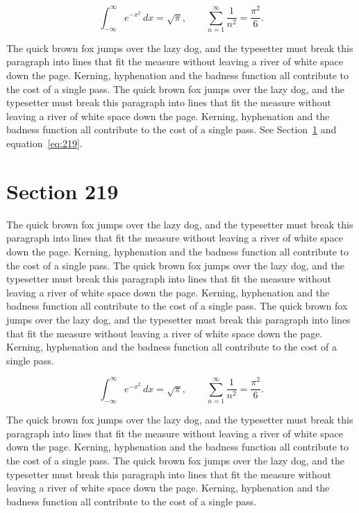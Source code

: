 \documentclass{article}
\begin{document}
\begin{equation}\label{eq:218}
\int_{-\infty}^{\infty} e^{-x^{2}}\,dx = \sqrt{\pi}, \qquad
\sum_{n=1}^{\infty} \frac{1}{n^{2}} = \frac{\pi^{2}}{6}.
\end{equation}

The quick brown fox jumps over the lazy dog, and the typesetter must break this paragraph into lines that fit the measure without leaving a river of white space down the page. Kerning, hyphenation and the badness function all contribute to the cost of a single pass. The quick brown fox jumps over the lazy dog, and the typesetter must break this paragraph into lines that fit the measure without leaving a river of white space down the page. Kerning, hyphenation and the badness function all contribute to the cost of a single pass. 
See Section~\ref{sec:219} and equation~\eqref{eq:219}.
\section{Section 219}
\label{sec:219}
The quick brown fox jumps over the lazy dog, and the typesetter must break this paragraph into lines that fit the measure without leaving a river of white space down the page. Kerning, hyphenation and the badness function all contribute to the cost of a single pass. The quick brown fox jumps over the lazy dog, and the typesetter must break this paragraph into lines that fit the measure without leaving a river of white space down the page. Kerning, hyphenation and the badness function all contribute to the cost of a single pass. The quick brown fox jumps over the lazy dog, and the typesetter must break this paragraph into lines that fit the measure without leaving a river of white space down the page. Kerning, hyphenation and the badness function all contribute to the cost of a single pass. 

\begin{equation}\label{eq:219}
\int_{-\infty}^{\infty} e^{-x^{2}}\,dx = \sqrt{\pi}, \qquad
\sum_{n=1}^{\infty} \frac{1}{n^{2}} = \frac{\pi^{2}}{6}.
\end{equation}

The quick brown fox jumps over the lazy dog, and the typesetter must break this paragraph into lines that fit the measure without leaving a river of white space down the page. Kerning, hyphenation and the badness function all contribute to the cost of a single pass. The quick brown fox jumps over the lazy dog, and the typesetter must break this paragraph into lines that fit the measure without leaving a river of white space down the page. Kerning, hyphenation and the badness function all contribute to the cost of a single pass. 
\end{document}

